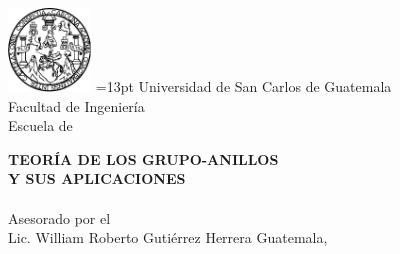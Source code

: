 

\newpage
\thispagestyle{empty}
\vbox{\noindent
\hspace{.7cm}
\includegraphics[width=2.2cm]{Pictures/escudo.png}}
=13pt
\hangindent=35mm\vspace{-1.72cm}
\noindent Universidad de San Carlos de Guatemala\\
Facultad de Ingeniería\\
Escuela de \Esc  \\ 
\vspace{4.8cm}
\begin{center}
{\large\textbf{TEORÍA DE LOS GRUPO-ANILLOS}} \\
{\large\textbf{Y SUS APLICACIONES}} \\ 
\vspace{6.50cm}
\textbf{\Nomb}\\ 
Asesorado por el \Ases \\
{\centering Lic. William Roberto Gutiérrez Herrera}
\vfill
Guatemala,  \Fec
\end{center}


